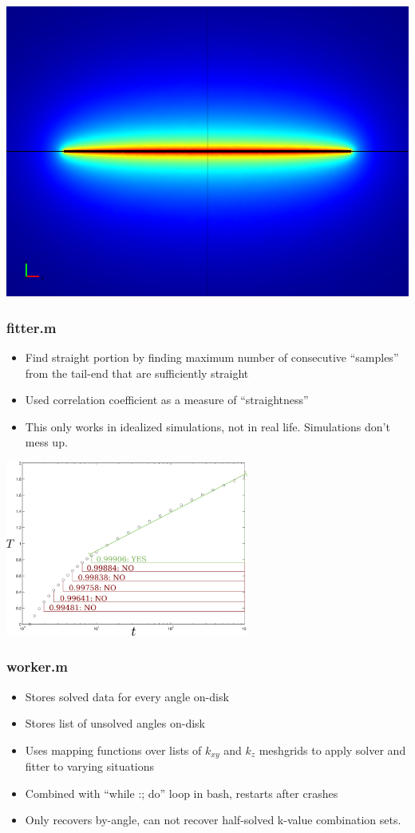 \documentclass{beamer}
\begin{document}
\begin{frame}
\includegraphics[width=\textwidth]{fig/35892_elem_1097s.png}
\end{frame}


\begin{frame}
\frametitle{fitter.m}
\begin{itemize}
\item Find straight portion by finding maximum number of consecutive ``samples''
from the tail-end that are sufficiently straight
\item Used correlation coefficient as a measure of ``straightness''
\item This only works in idealized simulations, not in real life. Simulations don't mess up.
\end{itemize}
\begin{center}
\includegraphics[width=0.6\textwidth]{fig/curvefit.png}
\end{center}
\end{frame}


\begin{frame}
\frametitle{worker.m}
\begin{itemize}
\item Stores solved data for every angle on-disk
\item Stores list of unsolved angles on-disk
\item Uses mapping functions over lists of \(k_{xy}\) and \(k_z\) meshgrids to
apply solver and fitter to varying situations
\item Combined with ``while :; do'' loop in bash, restarts after crashes
\item Only recovers by-angle, can not recover half-solved k-value combination sets.
\end{itemize}
\end{frame}
\end{document}
